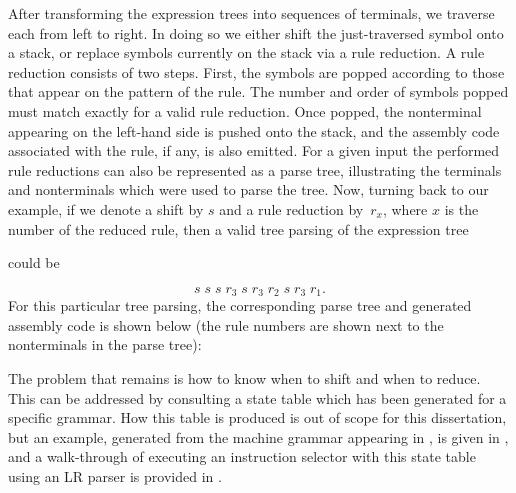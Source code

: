 {After transforming the \glspl{expression tree} into sequences of \glspl{terminal},
we traverse each from left to right.
%
In doing so we either \gls{shift} the
just-traversed \gls{symbol} onto a stack, or replace \glspl{symbol} currently on
the stack via a \gls{rule reduction}.
%
A \gls{rule reduction} consists of two steps.
%
First, the \glspl{symbol} are popped according to those that appear on
the \gls{pattern} of the \gls{rule}.
%
The number and order of \glspl{symbol}
popped must match exactly for a valid \gls{rule reduction}.
%
Once popped, the
\gls{nonterminal} appearing on the left-hand side is pushed onto the stack, and
the \gls{assembly code} associated with the \gls{rule}, if any, is also
emitted.
%
For a given input the performed \glspl{rule reduction} can also be
represented as a \gls{parse tree}, illustrating the \glspl{terminal} and
\glspl{nonterminal} which were used to parse the \gls{tree}.
%
Now, turning back to our example, if we denote a \gls{shift} by $s$ and a
\gls{rule reduction} by~$r_x$, where $x$ is the number of the reduced
\gls{rule}, then a valid \gls{tree parsing} of the \gls{expression tree}
\begin{center}
\end{center}
could be

\begin{displaymath}
 s \; s \; s \; r_3 \; s \; r_3 \; r_2 \; s \; r_3 \; r_1.
\end{displaymath}
For this particular \gls{tree parsing}, the corresponding \gls{parse tree} and
generated \gls{assembly code} is shown below (the \gls{rule} numbers are shown
next to the \glspl{nonterminal} in the \gls{parse tree}):
%    

The problem that remains is how to know when to \gls{shift} and when to reduce.
%
This can be addressed by consulting a state table which has been
generated for a specific \gls{grammar}.
%
How this table is produced is out of scope for this dissertation, but an
example, generated from the \gls{machine grammar} appearing in
, is given in
, and a walk-through of executing an
\gls{instruction selector} with this state table using an \gls{LR parser} is
provided in .

}
